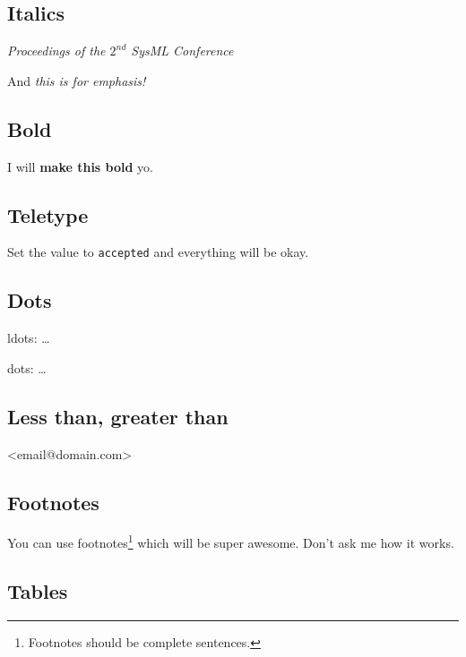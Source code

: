 \documentclass{article}
\begin{document}
\subsection{Italics}

\textit{Proceedings of the $\mathit{2}^{nd}$ SysML Conference}

And \emph{this is for emphasis!}

\subsection{Bold}

I will \textbf{make this bold} yo.

\subsection{Teletype}

Set the value to \texttt{accepted} and everything will be okay.

\subsection{Dots}

ldots: \ldots

dots: \dots

\subsection{Less than, greater than}

\textless{}email@domain.com\textgreater{}

\subsection{Footnotes}

You can use footnotes\footnote{Footnotes should be complete
  sentences.} which will be super awesome. Don't ask me how it works.

\subsection{Tables}
\end{document}
